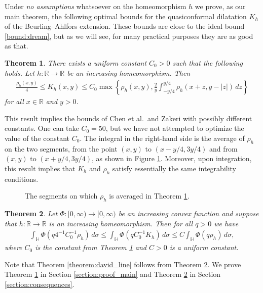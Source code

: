 \documentclass{amsart}
\theoremstyle{plain}
\newtheorem{theorem}{Theorem}
\theoremstyle{definition}
\theoremstyle{remark}
\numberwithin{equation}{section}
\numberwithin{theorem}{section}
\numberwithin{conjecture}{section}
\newcommand{\R}{\mathbb R}
\newcommand{\1}{\mathbf 1}
\newcommand{\UHP}{\mathbb H}
\begin{document}
Under \textit{no assumptions} whatsoever on the homeomorphism $h$ we prove, as our main theorem, the following optimal bounds for the quasiconformal dilatation $K_h$ of the Beurling--Ahlfors extension. These bounds are close to the ideal bound \eqref{bound:dream}, but as we will see, for many practical purposes they are as good as that.

\begin{theorem}\label{theorem:main}
There exists a uniform constant $C_0>0$ such that the following holds. Let $h\colon \R\to \R$ be an increasing homeomorphism. Then 
\begin{align*}
\frac{\rho_h(x,y)}{4}\leq K_h(x,y) \leq  C_0 \max \left\{\rho_h(x,y), \frac{2}{y}\int_{-y/4}^{y/4} \rho_h(x+z,y-|z|)\, dz \right\}
\end{align*}
for all $x\in \R$ and $y>0$. 
\end{theorem}
This result implies the bounds of Chen et al.\ and Zakeri with possibly different constants. One can take $C_0=50$, but we have not attempted to optimize the value of the constant $C_0$. The integral in the right-hand side is the average of $\rho_h$ on the two segments, from the point $(x,y)$ to $(x-y/4,3y/4)$ and from $(x,y)$ to $(x+y/4,3y/4)$, as shown in Figure \ref{figure:average}. Moreover, upon integration, this result implies that $K_h$ and $\rho_h$ satisfy essentially the same integrability conditions.


\begin{figure}
\caption{The segments on which $\rho_h$ is averaged in Theorem \ref{theorem:main}.}\label{figure:average}
\end{figure}

\begin{theorem}\label{theorem:convex_line}
Let $\Phi\colon [0,\infty)\to [0,\infty)$ be an increasing convex function and suppose that $h\colon \R\to \R$ is an increasing homeomorphism. Then for all $q>0$ we have
\begin{align*}
\int_{\UHP} \Phi(q4^{-1}C_0^{-1}\rho_h)  \, d\sigma\leq  \int_{\UHP} \Phi(qC_0^{-1}K_h) \, d\sigma \leq C\int_{\UHP} \Phi(q \rho_h)  \, d\sigma,
\end{align*}
where $C_0$ is the constant from Theorem \ref{theorem:main} and $C>0$ is a uniform constant.
\end{theorem}
Note that  Theorem \ref{theorem:david_line} follows from Theorem \ref{theorem:convex_line}. We prove Theorem \ref{theorem:main} in Section \ref{section:proof_main} and Theorem \ref{theorem:convex_line} in Section \ref{section:consequences}.
\end{document}
